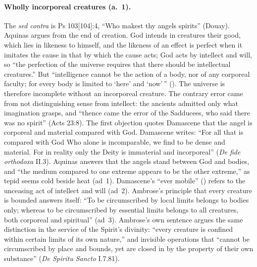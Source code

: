 \paragraph{Wholly incorporeal creatures (a.~1).} The \emph{sed contra} is
Ps 103[104]:4, ``Who makest thy angels spirits'' (Douay). Aquinas argues
from the end of creation. God intends in creatures their good, which lies
in likeness to himself, and the likeness of an effect is perfect when it
imitates the cause in that by which the cause acts; God acts by intellect
and will, so ``the perfection of the universe requires that there should be
intellectual creatures.'' But ``intelligence cannot be the action of a
body, nor of any corporeal faculty; for every body is limited to `here' and
`now'\,'' (). The universe is
therefore incomplete without an incorporeal creature. The contrary error
came from not distinguishing sense from intellect: the ancients admitted
only what imagination grasps, and ``thence came the error of the
Sadducees, who said there was no spirit'' (Acts 23:8). The first objection
quotes Damascene that the angel is corporeal and material compared with
God. Damascene writes: ``For all that is compared
with God Who alone is incomparable, we find to be dense and material. For
in reality only the Deity is immaterial and incorporeal'' (\emph{De fide
orthodoxa} II.3). Aquinas answers that the angels stand between God and
bodies, and ``the medium compared to one extreme appears to be the other
extreme,'' as tepid seems cold beside heat (ad~1). Damascene's ``ever
mobile'' () refers to the unceasing act of intellect
and will (ad~2). Ambrose's principle that every creature is bounded answers
itself: ``To be circumscribed by local limits belongs to bodies only;
whereas to be circumscribed by essential limits belongs to all creatures,
both corporeal and spiritual'' (ad~3). Ambrose's own sentence argues the
same distinction in the service of the Spirit's divinity: ``every creature
is confined within certain limits of its own nature,'' and invisible
operations that ``cannot be circumscribed by place and bounds, yet are
closed in by the property of their own substance'' (\emph{De Spiritu
Sancto} I.7.81).

